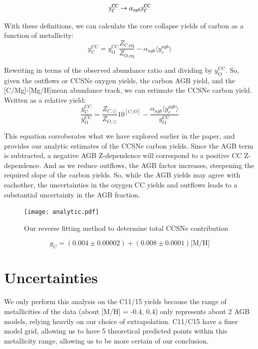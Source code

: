 \documentclass[12pt,oneside]{report}
\newcommand{\caah}{[C/Mg]-[Mg/H]}
\newcommand{\sun}{\ensuremath{\odot}}
\begin{document}
\begin{equation}
    y_{\rm C}^{\rm CC} \rightarrow \alpha_{agb}  y_{\rm C}^{\rm CC}
\end{equation}

With these definitions, we can calculate the core collapse yields of carbon as a function of metallicity:
\begin{equation}
    y_\text{C}^\text{CC} =  y_\text{O}^\text{CC} \frac{Z_\text{C,eq}}{Z_\text{O,eq}} - \alpha_{agb} \langle y_c^{agb} \rangle
\end{equation}

Rewriting in terms of the observed abundance ratio and dividing by
$y_\text{O}^\text{CC}$. So, given the outflows or CCSNe oxygen yields, the
carbon AGB yield, and the \caah mean abundance track, we can estimate the CCSNe carbon yield. Written as a relative yield:
\begin{equation}
    \frac{y_\text{C}^\text{CC}}{y_\text{O}^\text{CC}} = \frac{Z_{C, \sun}}{Z_{O, \sun}} 10^{[C/O]} - \frac{\alpha_{agb} \langle y_c^{agb} \rangle}{ y_\text{O}^\text{CC}}
\end{equation}

This equation corroberates what we have explored earlier in the paper, and provides our analytic estimates of the CCSNe carbon yields. Since the AGB term is subtracted, a negative AGB Z-dependence will correspond to a positive CC Z-dependence. And as we reduce outflows, the AGB factor increases, steepening the required slope of the carbon yields. So, while the AGB yields may agree with eachother, the uncertainties in the oxygen CC yields and outflows leads to a substantial uncertainty in the AGB fraction.  

\begin{figure}
    \centering
    \texttt{[image: analytic.pdf]}
    \caption[Reverse fit yields]{Our reverse fitting method to determine total CCSNe contribution}
\end{figure}

\begin{equation}
    y_C = (0.004 \pm 0.00002) + (0.008 \pm 0.0001) \text{[M/H]} 
\end{equation}

\section{Uncertainties}

We only perform this analysis on the C11/15 yields because the range of metallicities of the data (about [M/H] = -0.4, 0.4) only represents about 2 AGB models, relying heavily on our choice of extrapolation. C11/C15 have a finer model grid, allowing us to have 5 theoretical predicted points within this metallicity range, allowing us to be more certain of our conclusion. 
\end{document}
